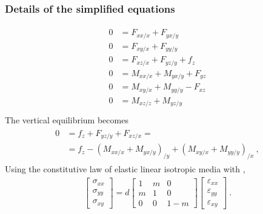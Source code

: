 \documentclass[letterpaper,10pt,english]{jupyterBook}
\begin{document}
\subsubsection*{Details of the simplified equations}
\begin{equation*}
\begin{split}\begin{aligned}
  0 & = F_{xx/x} + F_{yx/y}                    \\ 
  0 & = F_{xy/x} + F_{yy/y}                    \\ 
  0 & = F_{xz/x} + F_{yz/y}              + f_z \\ 
  0 & = M_{xx/x} + M_{yx/y} + F_{yz}           \\ 
  0 & = M_{xy/x} + M_{yy/y} - F_{xz}           \\ 
  0 & = M_{xz/z} + M_{yz/y}                    \\ 
\end{aligned}\end{split}
\end{equation*}
\sphinxAtStartPar
The vertical equilibrium becomes
\begin{equation*}
\begin{split}\begin{aligned}
  0
  & = f_z + F_{yz/y} + F_{xz/x} = \\
  & = f_z - \left( M_{xx/x} + M_{yx/y} \right)_{/y} + \left( M_{xy/x} + M_{yy/y} \right)_{/x} \ ,
\end{aligned}\end{split}
\end{equation*}
\sphinxAtStartPar
Using the constitutive law of elastic linear isotropic media with {\hyperref[\detokenize{ch/solids/plates-shells/stress-strain-state:solid-mechanics-small-displacements-plates-shells-stress-strain-state-planar-stress}]{}},
\begin{equation*}
\begin{split}\begin{bmatrix} \sigma_{xx} \\ \sigma_{yy} \\ \sigma_{xy} \end{bmatrix} = d \begin{bmatrix} 1 & m  & 0 \\ m  & 1 & 0 \\ 0 & 0 & 1-m \end{bmatrix} \begin{bmatrix} \varepsilon_{xx} \\ \varepsilon_{yy} \\ \varepsilon_{xy} \end{bmatrix} \ .\end{split}
\end{equation*}
\end{document}
